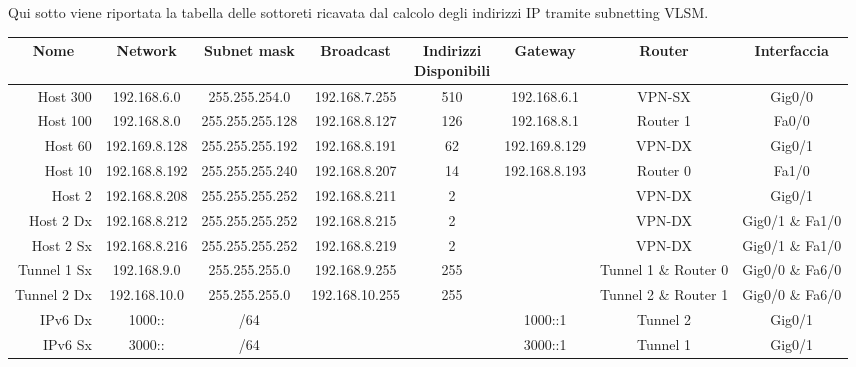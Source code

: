 Qui sotto viene riportata la tabella delle sottoreti ricavata dal calcolo degli indirizzi IP tramite subnetting VLSM.

\begin{adjustbox}{center}
    \begin{tabular}{rccccccc}
        \toprule
        \multicolumn{1}{c}{Nome} & Network & Subnet mask & Broadcast & \shortstack{Indirizzi\\Disponibili} & Gateway & Router & Interfaccia\\
        \midrule 
        Host 300    & 192.168.6.0   & 255.255.254.0   & 192.168.7.255  & 510 & 192.168.6.1   & VPN-SX               & Gig0/0\\
        Host 100    & 192.168.8.0   & 255.255.255.128 & 192.168.8.127  & 126 & 192.168.8.1   & Router 1             & Fa0/0\\
        Host 60     & 192.169.8.128 & 255.255.255.192 & 192.168.8.191  & 62  & 192.169.8.129 & VPN-DX               & Gig0/1\\
        Host 10     & 192.168.8.192 & 255.255.255.240 & 192.168.8.207  & 14  & 192.168.8.193 & Router 0             & Fa1/0\\
        Host 2      & 192.168.8.208 & 255.255.255.252 & 192.168.8.211  & 2   &               & VPN-DX               & Gig0/1\\
        Host 2 Dx   & 192.168.8.212 & 255.255.255.252 & 192.168.8.215  & 2   &               & VPN-DX               & Gig0/1 \& Fa1/0\\
        Host 2 Sx   & 192.168.8.216 & 255.255.255.252 & 192.168.8.219  & 2   &               & VPN-DX               & Gig0/1 \& Fa1/0\\
        Tunnel 1 Sx & 192.168.9.0   & 255.255.255.0   & 192.168.9.255  & 255 &               & Tunnel 1 \& Router 0 & Gig0/0 \& Fa6/0\\
        Tunnel 2 Dx & 192.168.10.0  & 255.255.255.0   & 192.168.10.255 & 255 &               & Tunnel 2 \& Router 1 & Gig0/0 \& Fa6/0\\
        IPv6 Dx     & 1000::        & /64             &                &     & 1000::1       & Tunnel 2             & Gig0/1\\
        IPv6 Sx     & 3000::        & /64             &                &     & 3000::1       & Tunnel 1             & Gig0/1\\
        \bottomrule
    \end{tabular}%
\end{adjustbox}